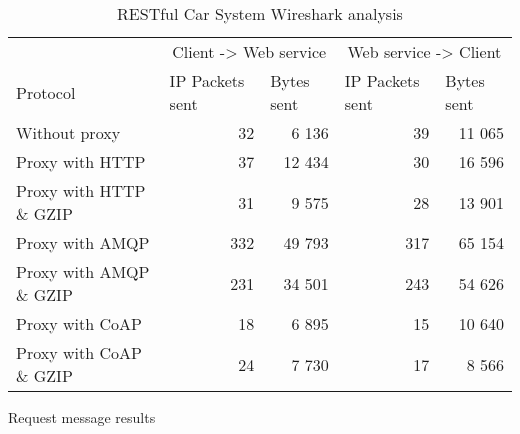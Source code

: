 \begin{appendices}
\begin{table}[H]
\begin{tabular}{lrrrr}
\hline
\multicolumn{1}{l}{}                  & \multicolumn{2}{c}{Client -> Web service}                           & \multicolumn{2}{c}{Web service -> Client}                           \\
\multicolumn{1}{l}{Protocol} & \multicolumn{1}{l}{IP Packets sent} & \multicolumn{1}{l}{Bytes sent} & \multicolumn{1}{l}{IP Packets sent} & \multicolumn{1}{l}{Bytes sent} \\ \hline
Without proxy                           & 32                                            & 6 136                                    & 39                                            & 11 065                                   \\
Proxy with HTTP                         & 37                                            & 12 434                                   & 30                                            & 16 596                                   \\
Proxy with HTTP \& GZIP                 & 31                                            & 9 575                                    & 28                                            & 13 901 \\
Proxy with AMQP                         & 332                                            & 49 793                                    & 317                                            & 65 154 \\
Proxy with AMQP \& GZIP                 & 231                                            & 34 501                                    & 243                                            & 54 626 \\
Proxy with CoAP                         & 18                                            & 6 895                                    & 15                                            & 10 640 \\
Proxy with CoAP \& GZIP                 & 24                                            & 7 730                                    & 17                                            & 8 566

\end{tabular}

\caption{RESTful Car System Wireshark analysis}

\end{table}


\begin{table}[H]

\caption{Request message results}
\end{table}


\end{appendices}
